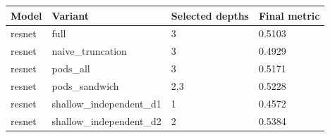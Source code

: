 \begin{tabular}{llll}
\hline
Model & Variant & Selected depths & Final metric \\
\hline
resnet & full & 3 & 0.5103 \\
resnet & naive\_truncation & 3 & 0.4929 \\
resnet & pods\_all & 3 & 0.5171 \\
resnet & pods\_sandwich & 2,3 & 0.5228 \\
resnet & shallow\_independent\_d1 & 1 & 0.4572 \\
resnet & shallow\_independent\_d2 & 2 & 0.5384 \\
\hline
\end{tabular}
